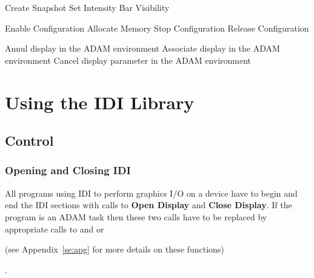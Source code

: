 \begin{routinelist}
               {Create Snapshot}
               {Set Intensity Bar Visibility}
\end{routinelist}
\begin{routinelist}
               {Enable Configuration}
               {Allocate Memory}
               {Stop Configuration}
               {Release Configuration}
\end{routinelist}
\begin{routinelist}
               {Annul display in the ADAM environment}
               {Associate display in the ADAM environment}
               {Cancel display parameter in the ADAM environment}
\end{routinelist}

\section{Using the IDI Library}

\subsection{Control}

\subsubsection{Opening and Closing IDI}

All programs using IDI to perform graphics I/O on a device have to begin and
end the IDI sections with calls to {\bf Open Display} and {\bf Close Display}.
If the program is an ADAM task then these two calls have to be replaced by
appropriate calls to  and 
 or 
\begin{latexonly}(see Appendix~\ref{se:apg} for more details on these 
functions)
\end{latexonly}.

